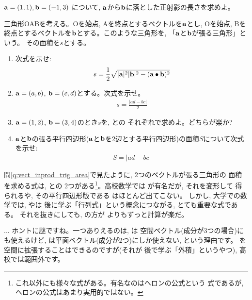 \begin{q}\label{q:vect_inprod_shadow2D1} ${\bf a}=(1,1), {\bf b}=(-1,3)$
について, ${\bf a}$から${\bf b}$に落とした正射影の長さを求めよ。
\end{q}\hv

\begin{q}\label{q:vect_inprod_trig_area} 三角形OABを考える。Oを始点, Aを終点とするベクトルを${\bf a}$とし, 
Oを始点, Bを終点とするベクトルを${\bf b}$とする。このような三角形を, 「${\bf a}$と${\bf b}$が張る三角形」という。
その面積を$s$とする。
\begin{enumerate}
\item 次式を示せ:
\begin{eqnarray}
s=\frac{1}{2}\sqrt{|{\bf a}|^2|{\bf b}|^2-({\bf a}\bullet{\bf b})^2}\label{eq:vect_inprod_trig_area1}
\end{eqnarray}
\item ${\bf a}=(a, b)$, ${\bf b}=(c, d)$とする。次式を示せ。
\begin{eqnarray}
s=\frac{|ad-bc|}{2}\label{eq:triangle_area2}
\end{eqnarray}
\item ${\bf a}=(1, 2)$, ${\bf b}=(3, 4)$のとき$s$を, 
との
それぞれで求めよ。どちらが楽か?
\item ${\bf a}$と${\bf b}$の張る平行四辺形(${\bf a}$と${\bf b}$を2辺とする平行四辺形)の面積$S$について次式を示せ:
\begin{eqnarray}
S=|ad-bc|\label{eq:parallelogram}
\end{eqnarray}
\end{enumerate}\end{q}
\hv

問\ref{q:vect_inprod_trig_area}で見たように, 2つのベクトルが張る三角形の
面積を求める式は, との
2つがある\footnote{これ以外にも様々な式がある。有名なのはヘロンの公式という
式であるが, ヘロンの公式はあまり実用的ではない。}。高校数学では
が有名だが, それを変形して
得られるや, その平行四辺形版である
はほとんど出てこない。
しかし, 大学での数学では, やは
後に学ぶ「行列式」という概念につながる, とても重要な式である。
それを抜きにしても, の方が
よりもずっと計算が楽だ。\hv

\begin{faq}{\small{} ... 
ホントに謎ですね。一つありえるのは, は
空間ベクトル(成分が3つの場合)にも使えるけど, 
は平面ベクトル(成分が2つ)にしか使えない, という理由です。
を空間に拡張することはできるのですが(それが
後で学ぶ「外積」というやつ), 高校では範囲外です。}\end{faq}\hv

